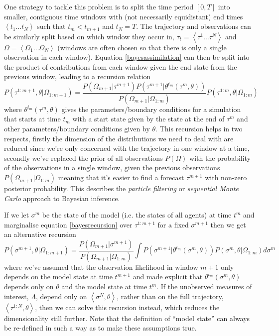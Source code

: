 \documentclass{article}
\begin{document}
One strategy to tackle this problem is to split the time period $[0,T]$ into smaller, contiguous time windows with (not necessarily equidistant) end times $\left<t_1 \dots t_N\right>$ such that $t_m < t_{m+1}$ and $t_N = T$. The trajectory and observations can be similarly split based on which window they occur in, $\tau_t = \left<\tau^1 \dots \tau^N\right>$ and $\Omega = \left<\Omega_1 \dots \Omega_N\right>$ (windows are often chosen so that there is only a single observation in each window). Equation \eqref{bayesassimilation} can then be split into the product of contributions from each window given the end state from the previous window, leading to a recursion relation
\begin{equation}
P\left(\tau^{1:m+1}, \theta | \Omega_{1:m+1}\right)
=
\frac{ P(\Omega_{m+1}|\tau^{m+1})P(\tau^{m+1}|\theta^{t_m}(\tau^m,\theta))}
{	P(\Omega_{m+1}| \Omega_{1:m}) }
P\left(\tau^{1:m},\theta| \Omega_{1:m}\right)
\label{bayesrecursion}
\end{equation}
where $\theta^{t_m}(\tau^m,\theta)$ gives the parameters/boundary conditions for a simulation that starts at time $t_m$ with a start state given by the state at the end of $\tau^m$ and other parameters/boundary conditions given by $\theta$. This recursion helps in two respects, firstly the dimension of the distributions we need to deal with are reduced since we're only concerned with the trajectory in one window at a time, secondly we've replaced the prior of all observations $P(\Omega)$ with the probability of the observations in a single window, given the previous observations $P(\Omega_{m+1}|\Omega_{1:m})$ meaning that it's easier to find a forecast $\tau^{m+1}$ with non-zero posterior probability. This describes the \textit{particle filtering} or \textit{sequential Monte Carlo} approach to Bayesian inference.

If we let $\sigma^m$ be the state of the model (i.e. the states of all agents) at time $t^m$ and marginalise equation \eqref{bayesrecursion} over $\tau^{1:m+1}$ for a fixed $\sigma^{m+1}$ then we get an alternative recursion
\begin{equation}
P\left(\sigma^{m+1}, \theta | \Omega_{1:m+1}\right)
=
\frac{ P(\Omega_{m+1}|\sigma^{m+1})}
{	P(\Omega_{m+1}| \Omega_{1:m}) }
\int P(\sigma^{m+1}|\theta^{t_m}(\sigma^m,\theta))P\left(\sigma^{m},\theta| \Omega_{1:m}\right) d \sigma^m
\label{bayesstaterecursion}
\end{equation}
where we've assumed that the observation likelihood in window $m+1$ only depends on the model state at time $t^{m+1}$ and made explicit that $\theta^{t_m}(\sigma^m,\theta)$ depends only on $\theta$ and the model state at time $t^m$.  If the unobserved measures of interest, $\Lambda$, depend only on $\left<\sigma^N,\theta\right>$, rather than on the full trajectory, $\left<\tau^{1:N},\theta\right>$, then we can solve this recursion instead, which reduces the dimensionality still further. Note that the definition of ``model state'' can always be re-defined in such a way as to make these assumptions true.
\end{document}
